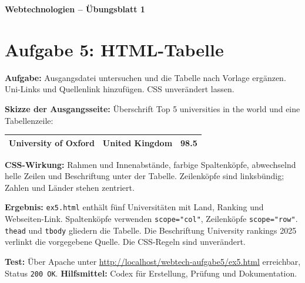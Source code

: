 \documentclass[11pt,a4paper]{article}
\begin{document}
\begin{center}
  {\Large\textbf{Webtechnologien -- Übungsblatt 1}}
\end{center}
\section*{Aufgabe 5: HTML-Tabelle}
\textbf{Aufgabe:} Ausgangsdatei untersuchen und die Tabelle nach Vorlage
ergänzen. Uni-Links und Quellenlink hinzufügen. CSS unverändert lassen.

\medskip
\textbf{Skizze der Ausgangsseite:} Überschrift
\glqq Top 5 universities in the world\grqq{} und eine Tabellenzeile:
\begin{center}
\begin{tabular}{|l|l|l|}
\hline
\textbf{University of Oxford} & United Kingdom & 98.5 \\ \hline
\end{tabular}
\end{center}
\textbf{CSS-Wirkung:} Rahmen und Innenabstände, farbige Spaltenköpfe,
abwechselnd helle Zeilen und Beschriftung unter der Tabelle.
Zeilenköpfe sind linksbündig; Zahlen und Länder stehen zentriert.

\medskip
\textbf{Ergebnis:} \texttt{ex5.html} enthält fünf Universitäten mit
Land, Ranking und Webseiten-Link. Spaltenköpfe verwenden
\texttt{scope="col"}, Zeilenköpfe \texttt{scope="row"}.
\texttt{thead} und \texttt{tbody} gliedern die Tabelle.
Die Beschriftung \glqq University rankings 2025\grqq{} verlinkt die
vorgegebene Quelle. Die CSS-Regeln sind unverändert.

\medskip
\textbf{Test:} Über Apache unter
\url{http://localhost/webtech-aufgabe5/ex5.html} erreichbar,
Status \texttt{200 OK}.
\medskip
{\small \textbf{Hilfsmittel:} Codex für Erstellung, Prüfung und Dokumentation.}
\end{document}
